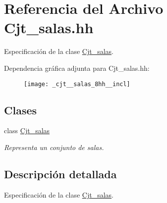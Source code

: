 \hypertarget{_cjt__salas_8hh}{}\section{Referencia del Archivo Cjt\+\_\+salas.\+hh}
\label{_cjt__salas_8hh}


Especificación de la clase \hyperlink{class_cjt__salas}{Cjt\+\_\+salas}.  


Dependencia gráfica adjunta para Cjt\+\_\+salas.\+hh\+:\nopagebreak
\begin{figure}[H]
\begin{center}
\leavevmode
\texttt{[image: \_cjt\_\_salas\_8hh\_\_incl]}
\end{center}
\end{figure}
\subsection*{Clases}
\begin{DoxyCompactItemize}
\item 
class \hyperlink{class_cjt__salas}{Cjt\+\_\+salas}
\begin{DoxyCompactList}\small\item\em Representa un conjunto de salas. \end{DoxyCompactList}\end{DoxyCompactItemize}


\subsection{Descripción detallada}
Especificación de la clase \hyperlink{class_cjt__salas}{Cjt\+\_\+salas}. 

